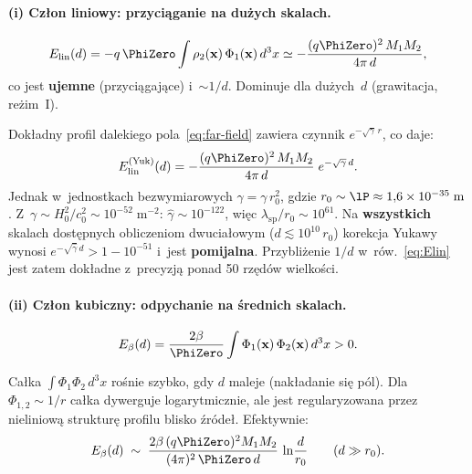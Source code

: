 \paragraph{(i) Cz\l{}on liniowy: przyci\k{a}ganie na du\.zych skalach.}

\begin{equation}\label{eq:Elin}
  E_{\mathrm{lin}}(d)
  = -q\,\PhiZero \int \rho_2(\mathbf{x})\,\Phi_1(\mathbf{x})\,d^3x
  \simeq -\frac{(q\PhiZero)^2\,M_1 M_2}{4\pi\,d},
\end{equation}
co jest \textbf{ujemne} (przyci\k{a}gaj\k{a}ce) i~$\sim 1/d$.
Dominuje dla du\.zych~$d$ (grawitacja, re\.zim~I).

\begin{remark}\label{rem:Elin-yukawa}
Dok\l{}adny profil dalekiego pola~\eqref{eq:far-field}
zawiera czynnik $e^{-\sqrt\gamma\,r}$, co daje:
\[
  E_{\mathrm{lin}}^{\mathrm{(Yuk)}}(d)
  = -\frac{(q\PhiZero)^2\,M_1 M_2}{4\pi\,d}\;
    e^{-\sqrt\gamma\,d}.
\]
Jednak w~jednostkach bezwymiarowych $\hat\gamma = \gamma\,r_0^2$,
gdzie $r_0 \sim \lP \approx 1{,}6 \times 10^{-35}\;\mathrm{m}$.
Z~$\gamma \sim H_0^2/c_0^2 \sim 10^{-52}\;\mathrm{m}^{-2}$:
$\hat\gamma \sim 10^{-122}$, wi\k{e}c
$\lambda_{\mathrm{sp}}/r_0 \sim 10^{61}$.
Na \textbf{wszystkich} skalach dost\k{e}pnych obliczeniom
dwucia\l{}owym ($d \lesssim 10^{10}\,r_0$) korekcja Yukawy
wynosi $e^{-\sqrt{\hat\gamma}\,d} > 1 - 10^{-51}$ i~jest
\textbf{pomijalna}. Przybli\.zenie $1/d$
w~r\'ow.~\eqref{eq:Elin} jest zatem dok\l{}adne
z~precyzj\k{a} ponad 50 rz\k{e}d\'ow wielko\'sci.
\end{remark}

\paragraph{(ii) Cz\l{}on kubiczny: odpychanie na \'srednich skalach.}

\begin{equation}\label{eq:Ebeta}
  E_{\beta}(d)
  = \frac{2\beta}{\PhiZero}\int \Phi_1(\mathbf{x})\,\Phi_2(\mathbf{x})\,d^3x
  > 0.
\end{equation}

Ca\l{}ka $\int\Phi_1\Phi_2\,d^3x$ ro\'snie szybko, gdy $d$
maleje (nak\l{}adanie si\k{e} p\'ol). Dla $\Phi_{1,2}\sim 1/r$
ca\l{}ka dywerguje logarytmicznie, ale jest regularyzowana
przez nieliniow\k{a} struktur\k{e} profilu blisko \'zr\'ode\l{}.
Efektywnie:
\begin{equation}
  E_{\beta}(d) \;\sim\; \frac{2\beta\,(q\PhiZero)^2 M_1 M_2}
  {(4\pi)^2\,\PhiZero\,d}\,\ln\!\frac{d}{r_0}
  \qquad (d \gg r_0).
\end{equation}

